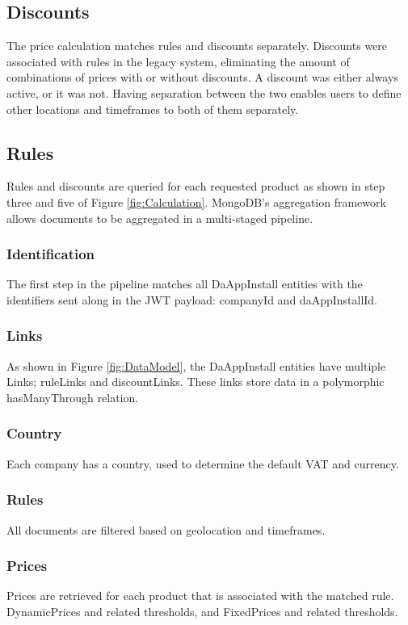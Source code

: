 \subsection{Discounts}
The price calculation matches rules and discounts separately. Discounts were associated with rules in the legacy system, eliminating the amount of combinations of prices with or without discounts. A discount was either always active, or it was not. Having separation between the two enables users to define other locations and timeframes to both of them separately.

\subsection{Rules}
Rules and discounts are queried for each requested product as shown in step three and five of Figure \ref{fig:Calculation}. MongoDB’s aggregation framework allows documents to be aggregated in a multi-staged pipeline.

\subsubsection{Identification}
The first step in the pipeline matches all DaAppInstall entities with the identifiers sent along in the JWT payload: companyId and daAppInstallId.
\subsubsection{Links}
As shown in Figure \ref{fig:DataModel}, the DaAppInstall entities have multiple Links; ruleLinks and discountLinks. These links store data in a polymorphic hasManyThrough relation.
\subsubsection{Country}
Each company has a country, used to determine the default VAT and currency.
\subsubsection{Rules}
All documents are filtered based on geolocation and timeframes.
\subsubsection{Prices}
Prices are retrieved for each product that is associated with the matched rule. DynamicPrices and related thresholds, and FixedPrices and related thresholds.
